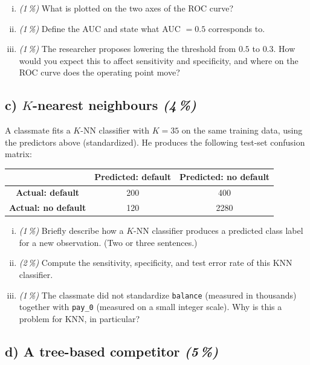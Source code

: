 \documentclass[11pt,a4paper]{article}
\newcommand{\subpoints}[1]{\textit{(#1\,\%)}}
\begin{document}
\begin{enumerate}[(i)]
  \item \subpoints{1} What is plotted on the two axes of the ROC curve?
  \item \subpoints{1} Define the AUC and state what AUC $= 0.5$ corresponds to.
  \item \subpoints{1} The researcher proposes lowering the threshold from $0.5$ to $0.3$. How would you expect this to affect sensitivity and specificity, and where on the ROC curve does the operating point move?
\end{enumerate}

\subsection*{c) $K$-nearest neighbours \subpoints{4}}

A classmate fits a $K$-NN classifier with $K = 35$ on the same training data, using the predictors above (standardized). He produces the following test-set confusion matrix:

\begin{center}\small
\begin{tabular}{c|cc}
 & \textbf{Predicted: default} & \textbf{Predicted: no default} \\ \hline
\textbf{Actual: default}    & 200  & 400 \\
\textbf{Actual: no default} & 120  & 2280 \\
\end{tabular}
\end{center}

\begin{enumerate}[(i)]
  \item \subpoints{1} Briefly describe how a $K$-NN classifier produces a predicted class label for a new observation. (Two or three sentences.)
  \item \subpoints{2} Compute the sensitivity, specificity, and test error rate of this KNN classifier.
  \item \subpoints{1} The classmate did not standardize \texttt{balance} (measured in thousands) together with \texttt{pay\_0} (measured on a small integer scale). Why is this a problem for KNN, in particular?
\end{enumerate}

\subsection*{d) A tree-based competitor \subpoints{5}}
\end{document}
